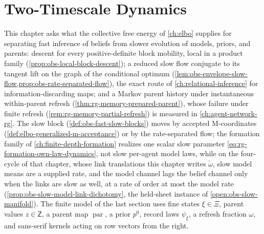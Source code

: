 \chapter{Two-Timescale Dynamics}
\label{ch:two-timescales}

This chapter asks what the collective free energy of \cref{ch:elbo} supplies for
separating fast inference of beliefs from slower evolution of models, priors, and
parents: descent for every positive-definite block mobility, local in a product family
(\cref{prop:obs-local-block-descent}); a reduced slow flow conjugate to its
tangent lift on the graph of the conditional optimum
(\cref{lem:obs-envelope-slow-flow,prop:obs-rate-separated-flow}), the exact route of
\cref{ch:relational-inference} for information-discarding maps; and a Markov parent
history under instantaneous within-parent refresh
(\cref{thm:rg-memory-prepared-parent}), whose failure under finite refresh
(\cref{rem:rg-memory-partial-refresh}) is measured in \cref{ch:agent-network-rg}. The
slow block (\cref{def:obs-fast-slow-blocks}) moves by accepted M-coordinates
(\cref{def:elbo-generalized-m-acceptance}) or by the rate-separated flow; the formation
family of \cref{ch:finite-depth-formation} realizes one scalar slow parameter
\eqref{eq:rg-formation-own-law-dynamics}, not slow per-agent model laws, while on
the four-cycle of that chapter, whose link translations this chapter writes
$\check\omega$, slow model means are a supplied rate, and the model
channel lags the belief channel only when the links are slow as well, at a rate of
order at most the model rate
(\cref{prop:obs-slow-model-link-dichotomy}, the held-sheet instance of
\cref{open:obs-slow-manifold}). The finite
model of the last section uses fine states $\xi\in\Xi$, parent values $z\in\mathsf Z$,
a parent map $\operatorname{par}$, a prior $p^0$, record laws $\psi_\xi$, a refresh
fraction $\omega$, and sans-serif kernels acting on row vectors from the right.

